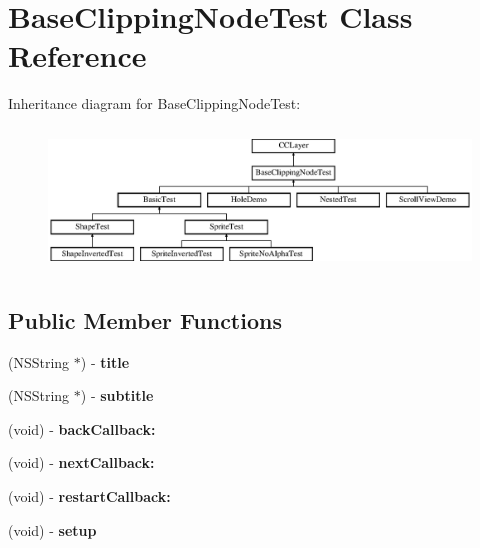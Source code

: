 \hypertarget{interface_base_clipping_node_test}{\section{Base\-Clipping\-Node\-Test Class Reference}
\label{interface_base_clipping_node_test}
}
Inheritance diagram for Base\-Clipping\-Node\-Test\-:\begin{figure}[H]
\begin{center}
\leavevmode
\includegraphics[height=3.809524cm]{interface_base_clipping_node_test}
\end{center}
\end{figure}
\subsection*{Public Member Functions}
\begin{DoxyCompactItemize}
\item 
\hypertarget{interface_base_clipping_node_test_add2552a9a52ab4a4c48bfa0b46fdb704}{(N\-S\-String $\ast$) -\/ {\bfseries title}}\label{interface_base_clipping_node_test_add2552a9a52ab4a4c48bfa0b46fdb704}

\item 
\hypertarget{interface_base_clipping_node_test_ad6d23b081c8f5cf130309b8712f88e73}{(N\-S\-String $\ast$) -\/ {\bfseries subtitle}}\label{interface_base_clipping_node_test_ad6d23b081c8f5cf130309b8712f88e73}

\item 
\hypertarget{interface_base_clipping_node_test_ab5525b0921b24bbfa878060734d122d0}{(void) -\/ {\bfseries back\-Callback\-:}}\label{interface_base_clipping_node_test_ab5525b0921b24bbfa878060734d122d0}

\item 
\hypertarget{interface_base_clipping_node_test_a0437844ed1ba99a362e90f0378d62a94}{(void) -\/ {\bfseries next\-Callback\-:}}\label{interface_base_clipping_node_test_a0437844ed1ba99a362e90f0378d62a94}

\item 
\hypertarget{interface_base_clipping_node_test_a952b8f7b7c7ce2c8b99dc5fc3e04f8e5}{(void) -\/ {\bfseries restart\-Callback\-:}}\label{interface_base_clipping_node_test_a952b8f7b7c7ce2c8b99dc5fc3e04f8e5}

\item 
\hypertarget{interface_base_clipping_node_test_a69e51084ed0cd2b1f62ee8031a4e921e}{(void) -\/ {\bfseries setup}}\label{interface_base_clipping_node_test_a69e51084ed0cd2b1f62ee8031a4e921e}

\end{DoxyCompactItemize}


